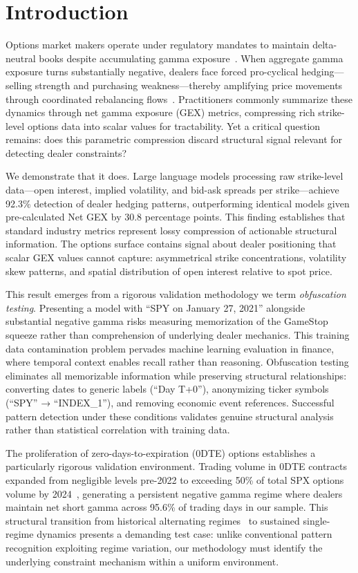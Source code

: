 \section{Introduction}

Options market makers operate under regulatory mandates to maintain delta-neutral books despite accumulating gamma exposure~\citep{sec15c31}. When aggregate gamma exposure turns substantially negative, dealers face forced pro-cyclical hedging—selling strength and purchasing weakness—thereby amplifying price movements through coordinated rebalancing flows~\citep{ni2005stock,garleanu2009demand}. Practitioners commonly summarize these dynamics through net gamma exposure (GEX) metrics, compressing rich strike-level options data into scalar values for tractability. Yet a critical question remains: does this parametric compression discard structural signal relevant for detecting dealer constraints?

We demonstrate that it does. Large language models processing raw strike-level data—open interest, implied volatility, and bid-ask spreads per strike—achieve 92.3\% detection of dealer hedging patterns, outperforming identical models given pre-calculated Net GEX by 30.8 percentage points. This finding establishes that standard industry metrics represent lossy compression of actionable structural information. The options surface contains signal about dealer positioning that scalar GEX values cannot capture: asymmetrical strike concentrations, volatility skew patterns, and spatial distribution of open interest relative to spot price.

This result emerges from a rigorous validation methodology we term \textit{obfuscation testing}. Presenting a model with ``SPY on January 27, 2021'' alongside substantial negative gamma risks measuring memorization of the GameStop squeeze rather than comprehension of underlying dealer mechanics. This training data contamination problem pervades machine learning evaluation in finance, where temporal context enables recall rather than reasoning. Obfuscation testing eliminates all memorizable information while preserving structural relationships: converting dates to generic labels (``Day T+0''), anonymizing ticker symbols (``SPY'' → ``INDEX\_1''), and removing economic event references. Successful pattern detection under these conditions validates genuine structural analysis rather than statistical correlation with training data.

The proliferation of zero-days-to-expiration (0DTE) options establishes a particularly rigorous validation environment. Trading volume in 0DTE contracts expanded from negligible levels pre-2022 to exceeding 50\% of total SPX options volume by 2024~\citep{cboe2023}, generating a persistent negative gamma regime where dealers maintain net short gamma across 95.6\% of trading days in our sample. This structural transition from historical alternating regimes~\citep{ni2005stock,garleanu2009demand} to sustained single-regime dynamics presents a demanding test case: unlike conventional pattern recognition exploiting regime variation, our methodology must identify the underlying constraint mechanism within a uniform environment.


